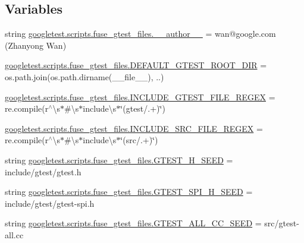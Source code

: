 \subsection*{Variables}
\begin{DoxyCompactItemize}
\item 
string \mbox{\hyperlink{namespacegoogletest_1_1scripts_1_1fuse__gtest__files_aa7e865995867f1d5371585bf2f1927c1}{googletest.\+scripts.\+fuse\+\_\+gtest\+\_\+files.\+\_\+\+\_\+author\+\_\+\+\_\+}} = \textquotesingle{}wan@google.\+com (Zhanyong Wan)\textquotesingle{}
\item 
\mbox{\hyperlink{namespacegoogletest_1_1scripts_1_1fuse__gtest__files_ad44025ca5a6e6f235af5f33b465cb520}{googletest.\+scripts.\+fuse\+\_\+gtest\+\_\+files.\+D\+E\+F\+A\+U\+L\+T\+\_\+\+G\+T\+E\+S\+T\+\_\+\+R\+O\+O\+T\+\_\+\+D\+IR}} = os.\+path.\+join(os.\+path.\+dirname(\+\_\+\+\_\+file\+\_\+\+\_\+), \textquotesingle{}..\textquotesingle{})
\item 
\mbox{\hyperlink{namespacegoogletest_1_1scripts_1_1fuse__gtest__files_a85d55937c8224f68d5f0e832a2f520e0}{googletest.\+scripts.\+fuse\+\_\+gtest\+\_\+files.\+I\+N\+C\+L\+U\+D\+E\+\_\+\+G\+T\+E\+S\+T\+\_\+\+F\+I\+L\+E\+\_\+\+R\+E\+G\+EX}} = re.\+compile(r\textquotesingle{}$^\wedge$\textbackslash{}s$\ast$\#\textbackslash{}s$\ast$include\textbackslash{}s$\ast$\char`\"{}(gtest/.+)\char`\"{}\textquotesingle{})
\item 
\mbox{\hyperlink{namespacegoogletest_1_1scripts_1_1fuse__gtest__files_af4bfb997cf40f502c49c06130042ecd4}{googletest.\+scripts.\+fuse\+\_\+gtest\+\_\+files.\+I\+N\+C\+L\+U\+D\+E\+\_\+\+S\+R\+C\+\_\+\+F\+I\+L\+E\+\_\+\+R\+E\+G\+EX}} = re.\+compile(r\textquotesingle{}$^\wedge$\textbackslash{}s$\ast$\#\textbackslash{}s$\ast$include\textbackslash{}s$\ast$\char`\"{}(src/.+)\char`\"{}\textquotesingle{})
\item 
string \mbox{\hyperlink{namespacegoogletest_1_1scripts_1_1fuse__gtest__files_a444357e90a8592574204c726fd3daf38}{googletest.\+scripts.\+fuse\+\_\+gtest\+\_\+files.\+G\+T\+E\+S\+T\+\_\+\+H\+\_\+\+S\+E\+ED}} = \textquotesingle{}include/gtest/gtest.\+h\textquotesingle{}
\item 
string \mbox{\hyperlink{namespacegoogletest_1_1scripts_1_1fuse__gtest__files_ad38125c1fe8cb7fc1edbb172562c0adb}{googletest.\+scripts.\+fuse\+\_\+gtest\+\_\+files.\+G\+T\+E\+S\+T\+\_\+\+S\+P\+I\+\_\+\+H\+\_\+\+S\+E\+ED}} = \textquotesingle{}include/gtest/gtest-\/spi.\+h\textquotesingle{}
\item 
string \mbox{\hyperlink{namespacegoogletest_1_1scripts_1_1fuse__gtest__files_af781f67b3331047c10a313c43cf5182f}{googletest.\+scripts.\+fuse\+\_\+gtest\+\_\+files.\+G\+T\+E\+S\+T\+\_\+\+A\+L\+L\+\_\+\+C\+C\+\_\+\+S\+E\+ED}} = \textquotesingle{}src/gtest-\/all.\+cc\textquotesingle{}

\end{DoxyCompactItemize}
